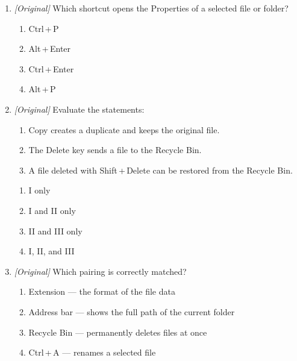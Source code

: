 \begin{enumerate}[label=\textbf{Q\arabic*.}, leftmargin=*]
\begin{enumerate}[label=\Alph*.]
  \end{enumerate}
\item \textit{[Original]} Which shortcut opens the Properties of a selected
  file or folder?
  \begin{enumerate}[label=\Alph*.]
    \item Ctrl\,+\,P
    \item Alt\,+\,Enter
    \item Ctrl\,+\,Enter
    \item Alt\,+\,P
  \end{enumerate}
\item \textit{[Original]} Evaluate the statements:
  \begin{enumerate}[label=\Roman*.]
    \item Copy creates a duplicate and keeps the original file.
    \item The Delete key sends a file to the Recycle Bin.
    \item A file deleted with Shift\,+\,Delete can be restored from the
      Recycle Bin.
  \end{enumerate}
  \begin{enumerate}[label=\Alph*.]
    \item I only
    \item I and II only
    \item II and III only
    \item I, II, and III
  \end{enumerate}
\item \textit{[Original]} Which pairing is correctly matched?
  \begin{enumerate}[label=\Alph*.]
    \item Extension --- the format of the file data
    \item Address bar --- shows the full path of the current folder
    \item Recycle Bin --- permanently deletes files at once
    \item Ctrl\,+\,A --- renames a selected file
  \end{enumerate}


\end{enumerate}
